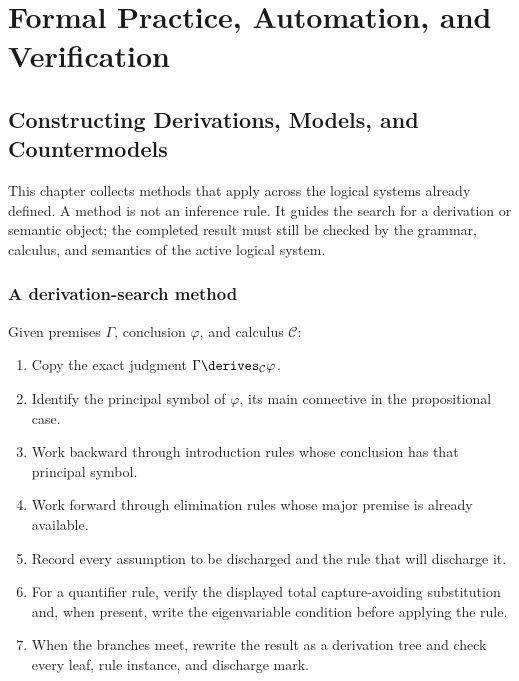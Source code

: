 \part{Formal Practice, Automation, and Verification}

\chapter{Constructing Derivations, Models, and Countermodels}
\label{ch:formal-practice}

This chapter collects methods that apply across the logical systems already
defined.  A method is not an inference rule.  It guides the search for a
derivation or semantic object; the completed result must still be checked by
the grammar, calculus, and semantics of the active logical system.

\section{A derivation-search method}
\label{sec:formal-practice-01}

\begin{method}
Given premises \(\Gamma\), conclusion \(\varphi\), and calculus
\(\mathcal C\):
\begin{enumerate}
  \item Copy the exact judgment \(\Gamma\derives_{\mathcal C}\varphi\).
  \item Identify the principal symbol of \(\varphi\), its main
        connective in the propositional case.
  \item Work backward through introduction rules whose conclusion has that
        principal symbol.
  \item Work forward through elimination rules whose major premise is already
        available.
  \item Record every assumption to be discharged and the rule that will
        discharge it.
  \item For a quantifier rule, verify the displayed total capture-avoiding
        substitution and, when present, write the eigenvariable condition
        before applying the rule.
  \item When the branches meet, rewrite the result as a derivation tree and
        check every leaf, rule instance, and discharge mark.
\end{enumerate}
\end{method}

